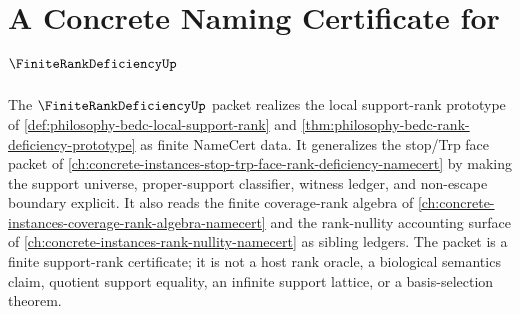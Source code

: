 \chapter{A Concrete Naming Certificate for $\FiniteRankDeficiencyUp$}
\label{ch:concrete-instances-finite-rank-deficiency-namecert}

The $\FiniteRankDeficiencyUp$ packet realizes the local support-rank prototype of \autoref{def:philosophy-bedc-local-support-rank} and \autoref{thm:philosophy-bedc-rank-deficiency-prototype} as finite NameCert data. It generalizes the stop/Trp face packet of \autoref{ch:concrete-instances-stop-trp-face-rank-deficiency-namecert} by making the support universe, proper-support classifier, witness ledger, and non-escape boundary explicit. It also reads the finite coverage-rank algebra of \autoref{ch:concrete-instances-coverage-rank-algebra-namecert} and the rank-nullity accounting surface of \autoref{ch:concrete-instances-rank-nullity-namecert} as sibling ledgers. The packet is a finite support-rank certificate; it is not a host rank oracle, a biological semantics claim, quotient support equality, an infinite support lattice, or a basis-selection theorem.

